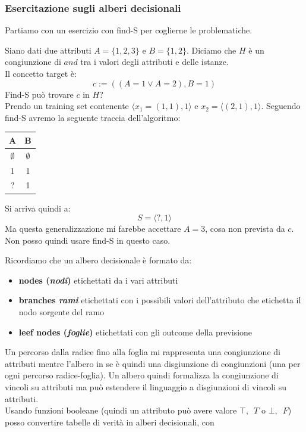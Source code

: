 \documentclass[a4paper,12pt, oneside]{book}
\begin{document}
\subsubsection{Esercitazione sugli alberi decisionali}
Partiamo con un esercizio con find-S per coglierne le problematiche.
\begin{esercizio}
  Siano dati due attributi $A=\{1,2,3\}$ e $B=\{1,2\}$. Diciamo che $H$ è un
  congiunzione di $and$ tra i valori degli attributi e delle istanze.\\
  Il concetto target è:
  \[c:=((A=1\lor A=2), B=1)\]
  Find-S può trovare $c$ in $H$?\\
  Prendo un training set contenente $\langle x_1=(1,1), 1\rangle$ e
  $x_2=\langle(2,1),1\rangle$. Seguendo find-S 
  avremo la seguente traccia dell'algoritmo:
  \begin{table}[H]
    \centering
    \begin{tabular}{c|c}
      A & B\\
      \hline
      $\emptyset$ & $\emptyset$\\
      1 & 1 \\
      ? & 1
    \end{tabular}
  \end{table}
  Si arriva quindi a:
  \[S=\langle ?,1\rangle\]
  Ma questa generalizzazione mi farebbe accettare $A=3$, cosa non prevista da
  $c$.\\
  Non posso quindi usare find-S in questo caso.
\end{esercizio}
Ricordiamo che un albero decisionale è formato da:
\begin{itemize}
  \item \textbf{nodes (\textit{nodi})} etichettati da i vari attributi
  \item \textbf{branches \textit{rami}} etichettati con i possibili valori
  dell'attributo che etichetta il nodo sorgente del ramo
  \item \textbf{leef nodes (\textit{foglie})} etichettati con gli outcome della
  previsione
\end{itemize}
Un percorso dalla radice fino alla foglia mi rappresenta una congiunzione di
attributi mentre l'albero in se è quindi una disgiunzione di congiunzioni (una
per ogni percorso radice-foglia). Un albero quindi formalizza la congiunzione di
vincoli su attributi ma può estendere il linguaggio a disgiunzioni di vincoli su
attributi.\\
Usando funzioni booleane (quindi un attributo può avere valore $\top,\,\,\,T$ o
$\bot,\,\,\,F$) posso convertire tabelle di verità in alberi decisionali, con
\end{document}
